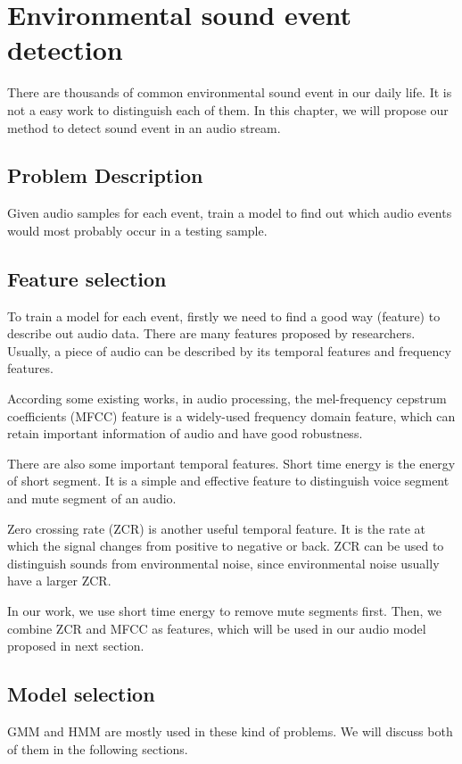\chapter{Environmental sound event detection}
There are thousands of common environmental sound event in our daily life. It is not a easy work to distinguish each of them. In this chapter, we will propose our method to detect sound event in an audio stream.

\section{Problem Description}
Given audio samples for each event, train a model to find out which audio events would most probably occur in a testing sample.

\section{Feature selection}
To train a model for each event, firstly we need to find a good way (feature) to describe out audio data. There are many features proposed by researchers. Usually, a piece of audio can be described by its temporal features and frequency features.

According some existing works\cite{1561288,1621215,mitrovic2010features, 4761905}, in audio processing, the mel-frequency cepstrum coefficients (MFCC) feature is a widely-used frequency domain feature, which can retain important information of audio and have good robustness. 

There are also some important temporal features. Short time energy is the energy of short segment. It is a simple and effective feature to distinguish voice segment and mute segment of an audio\cite{1181092}.

Zero crossing rate (ZCR) is another useful temporal feature. It is the rate at which the signal changes from positive to negative or back. ZCR can be used to distinguish sounds from environmental noise, since environmental noise usually have a larger ZCR.

In our work, we use short time energy to remove mute segments first. Then, we combine ZCR and MFCC as features, which will be used in our audio model proposed in next section.

\section{Model selection}
GMM and HMM are mostly used in these kind of problems. We will discuss both of them in the following sections.

